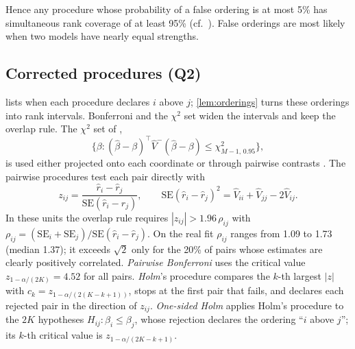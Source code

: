 \documentclass[12pt]{article}
\newcommand{\SE}{\mathrm{SE}}
\newcommand{\hb}{\hat\beta}
\begin{document}
Hence any procedure whose probability of a false ordering is at most 5\% has simultaneous rank coverage of at least 95\% (cf.\ \citealp{mogstad2024inference}). False orderings are most likely when two models have nearly equal strengths.

\subsection{Corrected procedures (Q2)}\label{sec:procs}

 lists when each procedure declares $i$ above $j$; \cref{lem:orderings} turns these orderings into rank intervals. Bonferroni and the $\chi^2$ set widen the intervals and keep the overlap rule. The $\chi^2$ set of \citet{chiang2024arena},
\[
\{\beta : (\hb - \beta)^\top\hat V^{-}(\hb - \beta) \le \chi^2_{M-1,\,0.95}\},
\]
is used either projected onto each coordinate or through pairwise contrasts \citep{scheffe1953method}. The pairwise procedures test each pair directly with
\[
z_{ij} = \frac{\hat r_i - \hat r_j}{\SE(\hat r_i - \hat r_j)}, \qquad \SE(\hat r_i - \hat r_j)^2 = \hat V_{ii} + \hat V_{jj} - 2\hat V_{ij}.
\]
In these units the overlap rule requires $|z_{ij}| > 1.96\,\rho_{ij}$ with $\rho_{ij} = (\SE_i + \SE_j)/\SE(\hat r_i - \hat r_j)$. On the real fit $\rho_{ij}$ ranges from 1.09 to 1.73 (median 1.37); it exceeds $\sqrt2$ only for the 20\% of pairs whose estimates are clearly positively correlated. \emph{Pairwise Bonferroni} uses the critical value $z_{1-\alpha/(2K)} = 4.52$ for all pairs. \emph{Holm}'s procedure \citep{holm1979simple} compares the $k$-th largest $|z|$ with $c_k = z_{1-\alpha/(2(K-k+1))}$, stops at the first pair that fails, and declares each rejected pair in the direction of $z_{ij}$. \emph{One-sided Holm} applies Holm's procedure to the $2K$ hypotheses $H_{ij}: \beta_i \le \beta_j$, whose rejection declares the ordering ``$i$ above $j$''; its $k$-th critical value is $z_{1-\alpha/(2K-k+1)}$.
\end{document}
